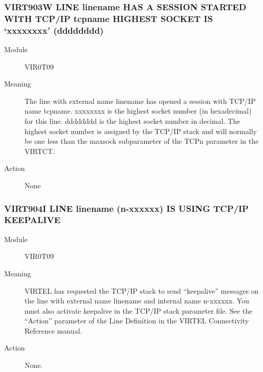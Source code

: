 \documentclass[letterpaper,10pt,english]{sphinxmanual}
\begin{document}
\subsubsection{VIRT903W LINE linename HAS A SESSION STARTED WITH TCP/IP tcpname HIGHEST SOCKET IS ‘xxxxxxxx’ (dddddddd)}
\label{\detokenize{messages:virt903w-line-linename-has-a-session-started-with-tcp-ip-tcpname-highest-socket-is-xxxxxxxx-dddddddd}}\begin{description}
\item[{Module}] \leavevmode
VIR0T09

\item[{Meaning}] \leavevmode
The line with external name linename has opened a session with TCP/IP name tcpname. xxxxxxxx is the highest socket number (in hexadecimal) for this line. dddddddd is the highest socket number in decimal. The highest socket number is assigned by the TCP/IP stack and will normally be one less than the maxsock subparameter of the TCPn parameter in the VIRTCT.

\item[{Action}] \leavevmode
None

\end{description}


\subsubsection{VIRT904I LINE linename (n-xxxxxx) IS USING TCP/IP KEEPALIVE}
\label{\detokenize{messages:virt904i-line-linename-n-xxxxxx-is-using-tcp-ip-keepalive}}\begin{description}
\item[{Module}] \leavevmode
VIR0T09

\item[{Meaning}] \leavevmode
VIRTEL has requested the TCP/IP  stack to send “keepalive” messages on the line with external name linename     and internal name n-xxxxxx. You must also activate keepalive in the TCP/IP stack parameter file. See the “Action” parameter of the Line Definition in the VIRTEL Connectivity Reference manual.

\item[{Action}] \leavevmode
None.

\end{description}
\end{document}
